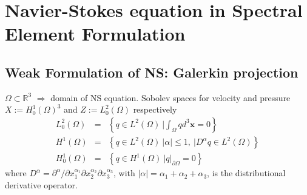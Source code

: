 
\chapter{Navier-Stokes equation in Spectral Element Formulation } %

\label{AppendixA} %

\section{Weak Formulation of NS: Galerkin projection}\label{galproj}
   
${\Omega} \subset \mathbb{R}^{3}$ $\Rightarrow$ domain of NS equation. 
 Sobolev spaces for velocity and pressure $X:= H_0^{1}(\Omega)^3$ and $Z:= L_{0}^{2}(\Omega)$ respectively
\begin{eqnarray}
L_{0}^{2}(\Omega)  & = &   \left\{ q \in L^2(\Omega) \ \Bigg| \int_{\Omega}q d^{3}\pmb{x} = 0 \right\} \\ 
H^{1}(\Omega) & = & \left\{ q \in L^2(\Omega) \ \vert \alpha \vert \leq 1, \ \Bigg| D^{\alpha}q \in L^2(\Omega)  \right\} \\
H_0^{1}(\Omega)    & = & \left\{ q \in H^1(\Omega) \ \Bigg| q \Big \vert_{\partial \Omega} = 0 \right\} 
\end{eqnarray}
where $D^{\alpha} = {\partial ^{\alpha}}/{\partial x_1^{\alpha_1}\partial x_2^{\alpha_2}\partial x_3^{\alpha_3}}$, with $\vert \alpha \vert = \alpha_1 + \alpha_2 + \alpha_3$, is the distributional derivative operator.

